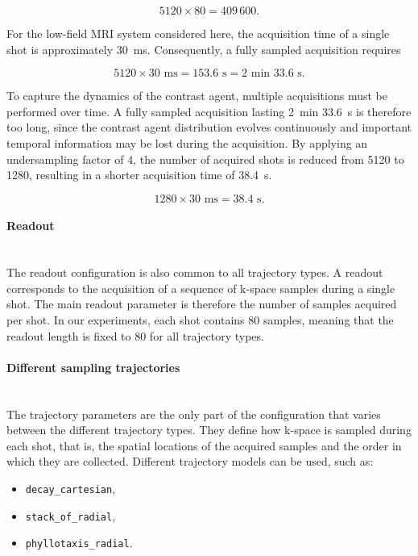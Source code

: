 \documentclass[12pt]{article}
\begin{document}
\[
5120 \times 80 = 409\,600.
\]

For the low-field MRI system considered here, the acquisition time of a single shot is approximately 30~ms. 
Consequently, a fully sampled acquisition requires

\[
5120 \times 30 \text{ ms}
=
153.6 \text{ s}
=
2 \text{ min } 33.6 \text{ s}.
\]

To capture the dynamics of the contrast agent, multiple acquisitions must be performed over time. 
A fully sampled acquisition lasting 2~min 33.6~s is therefore too long, since the contrast agent distribution evolves continuously and important temporal information may be lost during the acquisition. 
By applying an undersampling factor of 4, the number of acquired shots is reduced from 5120 to 1280, resulting in a shorter acquisition time of 38.4~s.

\[
1280 \times 30 \text{ ms}
=
38.4 \text{ s}.
\]

\paragraph{Readout}
\mbox{}\\

The readout configuration is also common to all trajectory types.
A readout corresponds to the acquisition of a sequence of k-space samples during a single shot. 
The main readout parameter is therefore the number of samples acquired per shot.
In our experiments, each shot contains 80 samples, meaning that the readout length is fixed to 80 for all trajectory types.

\paragraph{Different sampling trajectories}
\mbox{}\\

The trajectory parameters are the only part of the configuration that varies between the different trajectory types.
They define how k-space is sampled during each shot, that is, the spatial locations of the acquired samples and the order in which they are collected.
Different trajectory models can be used, such as:

\begin{itemize}
    \item \texttt{decay\_cartesian},
    \item \texttt{stack\_of\_radial},
    \item \texttt{phyllotaxis\_radial}.
\end{itemize}
\end{document}
